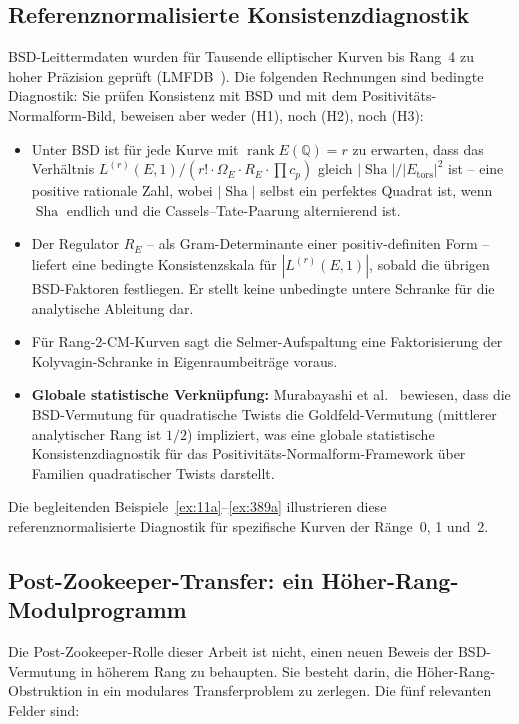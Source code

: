 \documentclass[aps,prd,twocolumn,superscriptaddress,nofootinbib,floatfix]{revtex4-2}
\theoremstyle{definition}
\theoremstyle{remark}
\DeclareMathOperator{\rank}{rank}
\DeclareMathOperator{\Sha}{Sha}
\begin{document}
\subsection{Referenznormalisierte Konsistenzdiagnostik}
\label{sec:numerical}

BSD-Leittermdaten wurden für Tausende elliptischer Kurven bis Rang~4 zu hoher Präzision geprüft (LMFDB~\cite{LMFDB}). Die folgenden Rechnungen sind bedingte Diagnostik: Sie prüfen Konsistenz mit BSD und mit dem Positivitäts-Normalform-Bild, beweisen aber weder (H1), noch (H2), noch (H3):
\begin{itemize}
\item Unter BSD ist für jede Kurve mit $\rank E(\mathbb{Q}) = r$ zu erwarten, dass das Verhältnis $L^{(r)}(E,1)/(r! \cdot \Omega_E \cdot R_E \cdot \prod c_p)$ gleich $|\Sha|/|E_{\mathrm{tors}}|^2$ ist -- eine positive rationale Zahl, wobei $|\Sha|$ selbst ein perfektes Quadrat ist, wenn $\Sha$ endlich und die Cassels--Tate-Paarung alternierend ist.
\item Der Regulator $R_E$ -- als Gram-Determinante einer positiv-definiten Form -- liefert eine bedingte Konsistenzskala für $|L^{(r)}(E,1)|$, sobald die übrigen BSD-Faktoren festliegen. Er stellt keine unbedingte untere Schranke für die analytische Ableitung dar.
\item Für Rang-2-CM-Kurven sagt die Selmer-\allowbreak Aufspaltung eine Faktorisierung der Kolyvagin-Schranke in Eigenraumbeiträge voraus.
\item \textbf{Globale statistische Verknüpfung:} Murabayashi et al.~\cite{Murabayashi2025} bewiesen, dass die BSD-Vermutung für quadratische Twists die Goldfeld-Vermutung (mittlerer analytischer Rang ist $1/2$) impliziert, was eine globale statistische Konsistenzdiagnostik für das Positivitäts-Normalform-Framework über Familien quadratischer Twists darstellt.
\end{itemize}

Die begleitenden Beispiele~\ref{ex:11a}--\ref{ex:389a} illustrieren diese referenznormalisierte Diagnostik für spezifische Kurven der Ränge~0, 1 und~2.

\subsection{Post-Zookeeper-Transfer: ein Höher-Rang-Modulprogramm}
\label{subsec:zookeeper-bsd-transfer}

Die Post-Zookeeper-Rolle dieser Arbeit ist nicht, einen neuen Beweis der
BSD-Vermutung in höherem Rang zu behaupten.  Sie besteht darin, die
Höher-Rang-Obstruktion in ein modulares Transferproblem zu zerlegen.  Die
fünf relevanten Felder sind:
\end{document}
